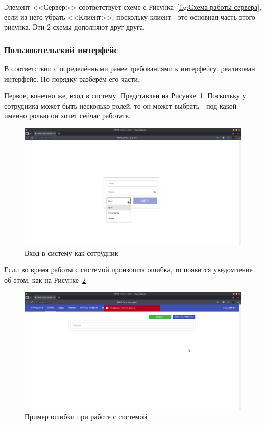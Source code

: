 \documentclass[a4paper,article]{article}
\begin{document}
\begin{sloppypar}
    Элемент <<Сервер>> соответствует схеме с Рисунка~\ref{fig:Схема работы сервера}, если из него убрать <<Клиент>>, поскольку клиент - это основная часть этого рисунка. Эти 2 схемы дополняют друг друга.

    \subsubsection{Пользовательский интерфейс}\label{Реализация. Клиентская часть. Пользовательский интерфейс}
    
    В соответствии с определёнными ранее требованиями к интерфейсу, реализован интерфейс. По порядку разберём его части. 
    
    Первое, конечно же, вход в систему. Представлен на Рисунке~\ref{fig:uilogin}. Поскольку у сотрудника может быть несколько ролей, то он может выбрать - под какой именно ролью он хочет сейчас работать.
    
    \begin{figure}[h]
        \centering
        \includegraphics[width=0.8\linewidth]{UI. Вход как сотрудник.png}        
        \caption{\centering Вход в систему как сотрудник}        
        \label{fig:uilogin}        
    \end{figure}
    
    \newpage
    
    Если во время работы с системой произошла ошибка, то появится уведомление об этом, как на Рисунке~\ref{fig:uierror}
    
    \begin{figure}[h]
        \centering
        \includegraphics[width=0.8\linewidth]{UI. Пример ошибки.png}        
        \caption{\centering Пример ошибки при работе с системой}        
        \label{fig:uierror}        
    \end{figure}
    

\end{sloppypar}
\end{document}
